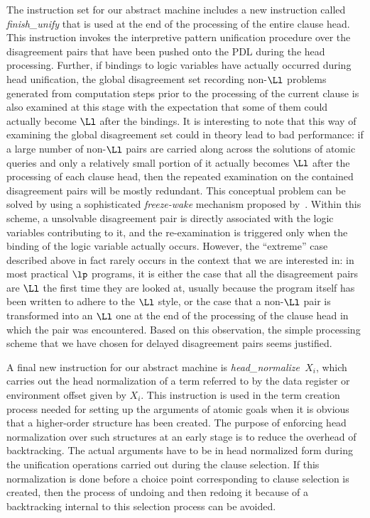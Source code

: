 The instruction set for our abstract machine includes a new
instruction called {\it finish\_unify} that is used at the end
of the processing of the entire clause head. This instruction invokes
the interpretive
pattern unification procedure over the disagreement pairs that have been
pushed onto the PDL during the head processing. Further, if bindings to logic
variables have actually occurred during head unification,
the global disagreement set recording non-$\Ll$ problems generated
from computation steps prior to the processing of the current clause is also
examined at this stage with the expectation that some of them could actually
become $\Ll$ after the bindings.
It is interesting to note that this way of examining the global disagreement
set could in theory lead to bad performance: if a large number of non-$\Ll$
pairs are carried along across the solutions of atomic queries and only a
relatively small portion of it actually becomes $\Ll$ after the processing
of each clause head, then the repeated examination on the contained
disagreement pairs will be mostly redundant. This conceptual problem can be
solved by using a sophisticated {\it freeze-wake} mechanism proposed
by~\cite{MP93ppcp}. Within this scheme, a unsolvable disagreement pair
is directly associated with the logic variables contributing to it, and
the re-examination is triggered only when the binding of the logic
variable actually occurs. However, the ``extreme'' case described
above in fact rarely occurs in the context that we are interested in: in most
practical $\lp$ programs, it is either the case that
all the disagreement pairs are $\Ll$ the first time they are looked
at, usually because the program itself has been written to adhere to
the $\Ll$ style, or the case that a non-$\Ll$ pair is
transformed into an $\Ll$ one at the end of the processing of the
clause head in which the pair was encountered.
Based on this observation, the simple processing scheme that we have
chosen for delayed disagreement pairs seems justified.

A final new instruction for our abstract machine is
{\it head\_normalize\ $X_i$}, which carries out the head normalization of a
term referred to by the data register or
environment offset given by $X_i$. This instruction is used in the term
creation process
needed for setting up the arguments of atomic goals when it is obvious that a
higher-order structure
has been created. The purpose of enforcing head normalization over such
structures at an early stage is to reduce the overhead of backtracking.
The actual arguments have to be in head normalized form
during the unification operations carried out during the clause
selection. If this normalization is done before a choice point
corresponding to clause selection is created, then the process of
undoing and then redoing it because of a backtracking internal to this
selection process can be avoided.

